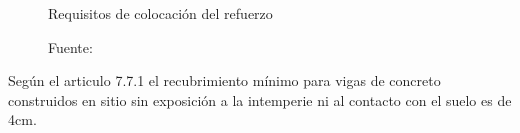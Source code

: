 \begin{figure}[h!]
    \centering
    \caption{Requisitos de colocación del refuerzo}
    \hspace{5mm}
    \caption*{\small Fuente: \it \cite{pasino2011}}
    \label{3}
\end{figure}
Según el articulo 7.7.1 el recubrimiento mínimo para vigas de concreto construidos en sitio sin exposición a la intemperie ni al contacto con el suelo es de 4cm.

